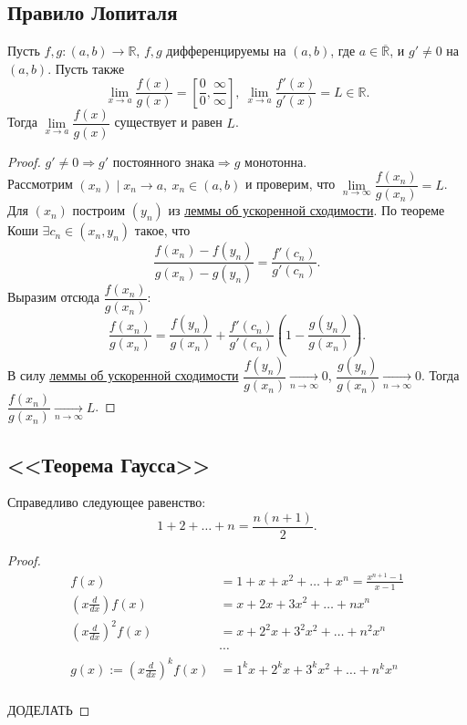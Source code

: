 \subsection{Правило Лопиталя}

\begin{theorem}
	Пусть $f, g \colon (a, b) \to \mathbb{R}$, $f, g$ дифференцируемы на $(a, b)$, где $a \in \overline{\mathbb{R}}$, и $g' \neq 0$ на $(a, b)$.
	Пусть также \[
		\lim_{x \to a} \frac{f(x)}{g(x)} = \left[ \frac00, \frac{\infty}{\infty} \right],
		~\lim_{x \to a} \frac{f'(x)}{g'(x)} = L \in \mathbb{R}.
	\]
	Тогда $\lim\limits_{x \to a} \dfrac{f(x)}{g(x)}$ существует и равен $L$.
\end{theorem}

\begin{proof}
	$g' \neq 0 \Rightarrow g' \text{ постоянного знака} \Rightarrow g \text{ монотонна}$. \\
	Рассмотрим $(x_n) \mid x_n \to a, ~x_n \in (a, b)$ и проверим, что $\lim\limits_{n \to \infty} \dfrac{f(x_n)}{g(x_n)} = L$.
	Для $(x_n)$ построим $(y_n)$ из \hyperlink{shodimost'}{леммы об ускоренной сходимости}. По теореме Коши
	$\exists c_n \in (x_n, y_n)$ такое, что \[
		\frac{f(x_n) - f(y_n)}{g(x_n) - g(y_n)} = \frac{f'(c_n)}{g'(c_n)}.
	\]
	Выразим отсюда $\dfrac{f(x_n)}{g(x_n)}$: \[
		\frac{f(x_n)}{g(x_n)} = \frac{f(y_n)}{g(x_n)} + \frac{f'(c_n)}{g'(c_n)} \left( 1 - \frac{g(y_n)}{g(x_n)} \right).
	\]
	В силу \hyperlink{shodimost'}{леммы об ускоренной сходимости}
	\hbox{$\dfrac{f(y_n)}{g(x_n)} \xrightarrow[n \to \infty]{} 0$}, \hbox{$\dfrac{g(y_n)}{g(x_n)} \xrightarrow[n \to \infty]{} 0$}.
	Тогда $\dfrac{f(x_n)}{g(x_n)} \xrightarrow[n \to \infty]{} L$.
\end{proof}

\subsection{<<Теорема Гаусса>>}

\begin{theorem}
	Справедливо следующее равенство: \[
		1 + 2 + \ldots + n = \frac{n (n + 1)}{2}.
	\]
\end{theorem}

\begin{proof}
	\begin{align*}
									    		f(x) &= 1 + x + x^2 + \ldots + x^n = \frac{x^{n + 1} - 1}{x - 1}		\\
		 		  \left( x \frac{d}{dx} \right) f(x) &= x + 2 x + 3 x^2 + \ldots + n x^n								\\
				\left( x \frac{d}{dx} \right)^2 f(x) &= x + 2^2 x + 3^2 x^2 + \ldots + n^2 x^n							\\
													 &\cdots															\\
		g(x) := \left( x \frac{d}{dx} \right)^k f(x) &= 1^k x + 2^k x + 3^k x^2 + \ldots + n^k x^n						\\
	\end{align*}
	
	ДОДЕЛАТЬ
\end{proof}

